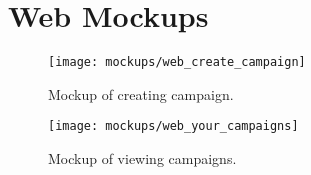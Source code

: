 
\chapter{Web Mockups}
\label{app:web_mockup}


\begin{figure}[!htbp]
    \centering
    \texttt{[image: mockups/web\_create\_campaign]}
    \caption{Mockup of creating campaign.}
    \label{fig:web_create_campaign_mockup}
\end{figure}
\FloatBarrier

\begin{figure}[!htbp]
    \centering
    \texttt{[image: mockups/web\_your\_campaigns]}
    \caption{Mockup of viewing campaigns.}
    \label{fig:web_your_campaigns_mockup}
\end{figure}
\FloatBarrier
